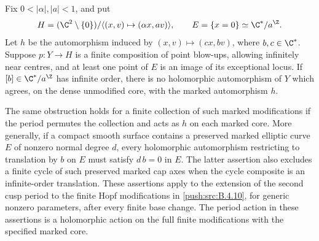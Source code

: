 \begin{proposition}\hypertarget{tag-030H}{}\label{push:src:B.4.13}

Fix $0<|\alpha|,|a|<1$, and put
\[
 H=(\C^2\setminus\{0\})/
       \langle(x,v)\mapsto(\alpha x,av)\rangle,
       \qquad E=\{x=0\}\simeq\C^*/a^\Z.
\]
Let $h$ be the automorphism induced by
$(x,v)\mapsto(c x,bv)$, where $b,c\in\C^*$.
Suppose $p:Y\to H$ is a finite composition of point blow-ups,
allowing infinitely near centres, and at least one point of $E$
is an image of its exceptional locus. If $[b]\in\C^*/a^\Z$ has
infinite order, there is no holomorphic automorphism of $Y$
which agrees, on the dense unmodified core, with the marked
automorphism $h$.

The same obstruction holds for a finite collection of such marked
modifications if the period permutes the collection and
acts as $h$ on each marked core.
More generally, if a compact smooth surface contains a preserved
marked elliptic curve $E$ of nonzero normal degree $d$, every
holomorphic automorphism restricting to translation by $b$ on $E$
must satisfy $d\,b=0$ in $E$.
The latter assertion also excludes a finite cycle of such preserved
marked cap axes when the cycle composite is an infinite-order
translation. These assertions apply to the extension
of the second cusp period to the finite Hopf
modifications in \ref{push:src:B.4.10}, for generic nonzero parameters, after every
finite base change. The period action in these assertions is a holomorphic action on
the full finite modifications with the specified marked core.
\end{proposition}


